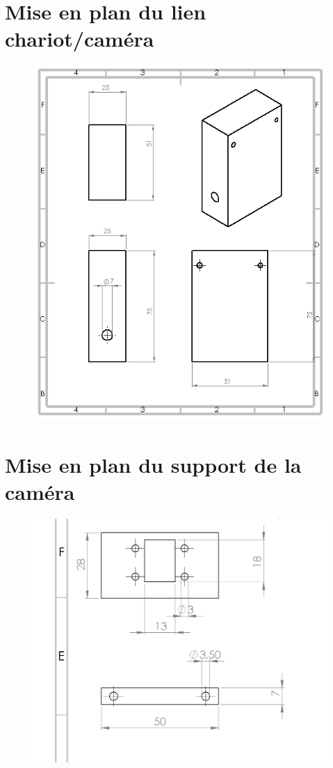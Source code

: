 \documentclass[12pt,a4paper]{report}
\newenvironment{changemargin}[2]{\begin{list}{}{%
\setlength{\topsep}{0pt}%
\setlength{\leftmargin}{0pt}%
\setlength{\rightmargin}{0pt}%
\setlength{\listparindent}{\parindent}%
\setlength{\itemindent}{\parindent}%
\setlength{\parsep}{0pt plus 1pt}%
\addtolength{\leftmargin}{#1}%
\addtolength{\rightmargin}{#2}%
}\item }{\end{list}}
\begin{document}
\begin{changemargin}{-2cm}{-4cm}
\chapter*{Mise en plan du lien chariot/caméra}
\begin{figure}[!h]
 \center
 \includegraphics[scale=0.95]{../3DModels/camerachariot.png}
\end{figure}
\chapter*{Mise en plan du support de la caméra}
\begin{figure}[!h]
 \center
 \includegraphics[scale=0.95]{../3DModels/camera.png}
\end{figure}
\end{changemargin}
\end{document}
